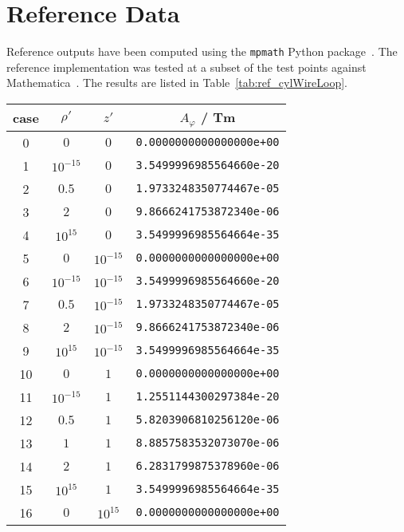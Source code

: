 \section{Reference Data}
\label{appx:reference_data}

Reference outputs have been computed using the \texttt{mpmath} Python package~\cite{mpmath}.
The reference implementation was tested at a subset of the test points against Mathematica~\cite{Mathematica}.
The results are listed in Table~\ref{tab:ref_cylWireLoop}.
\begin{table}[htbp]
  \centering
  \begin{tabular}{c|c|c|c}
    case & $\rho'$ & $z'$ & $A_\varphi$ / Tm \\
    \hline
     0 & $0$        & $0$        & \texttt{0.0000000000000000e+00} \\
     1 & $10^{-15}$ & $0$        & \texttt{3.5499996985564660e-20} \\
     2 & $0.5$      & $0$        & \texttt{1.9733248350774467e-05} \\
     3 & $2$        & $0$        & \texttt{9.8666241753872340e-06} \\
     4 & $10^{15}$  & $0$        & \texttt{3.5499996985564664e-35} \\
     5 & $0$        & $10^{-15}$ & \texttt{0.0000000000000000e+00} \\
     6 & $10^{-15}$ & $10^{-15}$ & \texttt{3.5499996985564660e-20} \\
     7 & $0.5$      & $10^{-15}$ & \texttt{1.9733248350774467e-05} \\
     8 & $2$        & $10^{-15}$ & \texttt{9.8666241753872340e-06} \\
     9 & $10^{15}$  & $10^{-15}$ & \texttt{3.5499996985564664e-35} \\
    10 & $0$        & $1$        & \texttt{0.0000000000000000e+00} \\
    11 & $10^{-15}$ & $1$        & \texttt{1.2551144300297384e-20} \\
    12 & $0.5$      & $1$        & \texttt{5.8203906810256120e-06} \\
    13 & $1$        & $1$        & \texttt{8.8857583532073070e-06} \\
    14 & $2$        & $1$        & \texttt{6.2831799875378960e-06} \\
    15 & $10^{15}$  & $1$        & \texttt{3.5499996985564664e-35} \\
    16 & $0$        & $10^{15}$  & \texttt{0.0000000000000000e+00} \\

\end{tabular}
\end{table}
